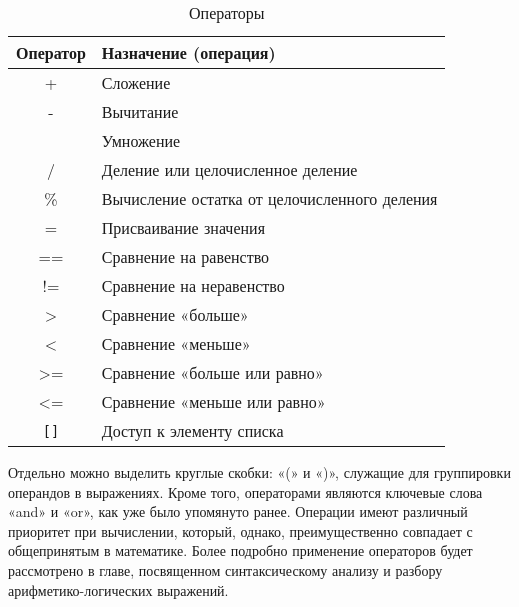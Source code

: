 \begin{table}[h]
    \centering
    \caption{Операторы}
    \label{tab:operators}
    \begin{tabular}{>{\ttfamily}c p{12cm}}
        \toprule
        \textrm{\normalfont Оператор} & \textrm{\normalfont Назначение (операция)}   \\
        \midrule
        +                             & Сложение                                     \\
        -                             & Вычитание                                    \\
        *                             & Умножение                                    \\
        /                             & Деление или целочисленное деление            \\
        \%                            & Вычисление остатка от целочисленного деления \\
        =                             & Присваивание значения                        \\
        ==                            & Сравнение на равенство                       \\
        !=                            & Сравнение на неравенство                     \\
        >                             & Сравнение «больше»                           \\
        <                             & Сравнение «меньше»                           \\
        >=                            & Сравнение «больше или равно»                 \\
        <=                            & Сравнение «меньше или равно»                 \\
        \verb|[]|                     & Доступ к элементу списка                     \\
        \bottomrule
    \end{tabular}
\end{table}

Отдельно можно выделить круглые скобки: «(» и «)», служащие для группировки операндов в выражениях.
Кроме того, операторами являются ключевые слова «and» и «or», как уже было упомянуто ранее.
Операции имеют различный приоритет при вычислении, который, однако, преимущественно совпадает с общепринятым в математике.
Более подробно применение операторов будет рассмотрено в главе, посвященном синтаксическому анализу и разбору арифметико-логических выражений.

